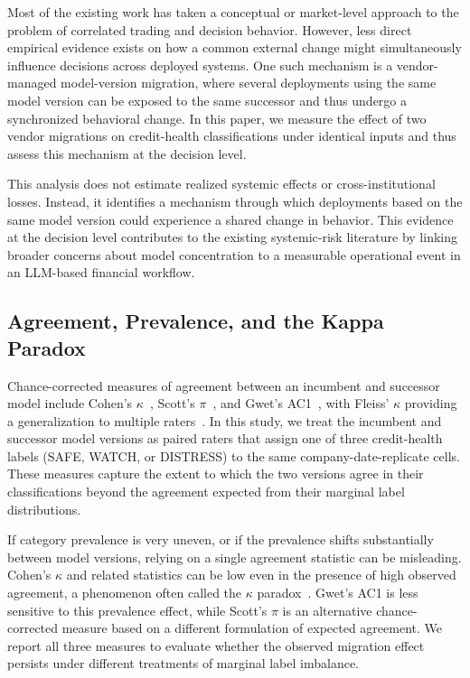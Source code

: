 \documentclass[11pt]{article}
\begin{document}
Most of the existing work has taken a conceptual or market-level approach to the problem of correlated trading and decision behavior. However, less direct empirical evidence exists on how a common external change might simultaneously influence decisions across deployed systems. One such mechanism is a vendor-managed model-version migration, where several deployments using the same model version can be exposed to the same successor and thus undergo a synchronized behavioral change. In this paper, we measure the effect of two vendor migrations on credit-health classifications under identical inputs and thus assess this mechanism at the decision level.

This analysis does not estimate realized systemic effects or cross-institutional losses. Instead, it identifies a mechanism through which deployments based on the same model version could experience a shared change in behavior. This evidence at the decision level contributes to the existing systemic-risk literature by linking broader concerns about model concentration to a measurable operational event in an LLM-based financial workflow.

\subsection{Agreement, Prevalence, and the Kappa Paradox}
Chance-corrected measures of agreement between an incumbent and successor model include Cohen's $\kappa$~\cite{cohen}, Scott's $\pi$~\cite{scott}, and Gwet's AC1~\cite{gwet}, with Fleiss' $\kappa$ providing a generalization to multiple raters~\cite{fleiss}. In this study, we treat the incumbent and successor model versions as paired raters that assign one of three credit-health labels (SAFE, WATCH, or DISTRESS) to the same company-date-replicate cells. These measures capture the extent to which the two versions agree in their classifications beyond the agreement expected from their marginal label distributions.

If category prevalence is very uneven, or if the prevalence shifts substantially between model versions, relying on a single agreement statistic can be misleading. Cohen's $\kappa$ and related statistics can be low even in the presence of high observed agreement, a phenomenon often called the $\kappa$ paradox~\cite{feinstein}. Gwet's AC1 is less sensitive to this prevalence effect, while Scott's $\pi$ is an alternative chance-corrected measure based on a different formulation of expected agreement. We report all three measures to evaluate whether the observed migration effect persists under different treatments of marginal label imbalance.
\end{document}
